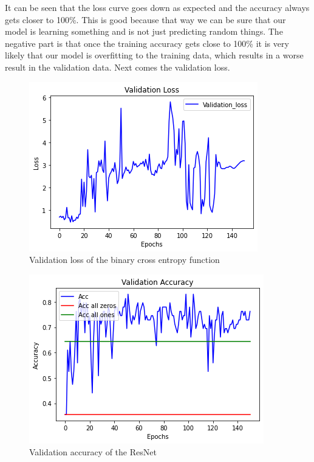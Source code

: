 \documentclass[journal]{IEEEtran}
\begin{document}
It can be seen that the loss curve goes down as expected and the accuracy always gets closer to 100\%. This is good because that way we can be sure that our model is learning something and is not just predicting random things. The negative part is that once the training accuracy gets close to 100\% it is very likely that our model is overfitting to the training data, which results in a worse result in the validation data. Next comes the validation loss.\\
\begin{figure}
\includegraphics[width=1\columnwidth]{../imgs/validation_loss_resnet.png}
\caption{Validation loss of the binary cross entropy function}
\end{figure}
\begin{figure}
\includegraphics[width=1\columnwidth]{../imgs/validation_accuracy_resnet.png}
\caption{Validation accuracy of the ResNet}
\end{figure}
\end{document}
